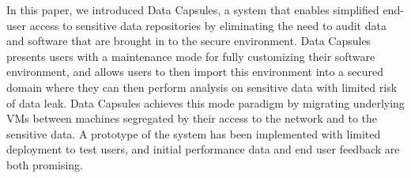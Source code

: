 \documentclass{acm_proc_article-sp}
\begin{document}
In this paper, we introduced Data Capsules, a system that enables simplified
end-user access to sensitive data repositories by eliminating the need to audit
data and software that are brought in to the secure environment.  Data Capsules
presents users with a maintenance mode for fully customizing their software
environment, and allows users to then import this environment into a secured
domain where they can then perform analysis on sensitive data with limited risk
of data leak.  Data Capsules achieves this mode paradigm by migrating
underlying VMs between machines segregated by their access to the network and
to the sensitive data.  A prototype of the system has been implemented with
limited deployment to test users, and initial performance data and end user
feedback are both promising.



\end{document}
